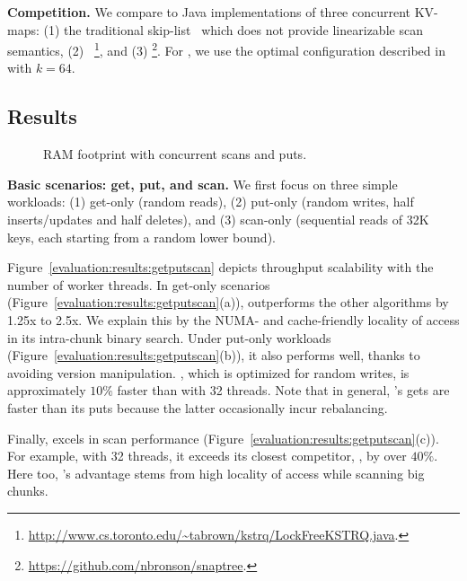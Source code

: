 \textbf{Competition.}
We compare {\kiwi} to Java implementations of three concurrent KV-maps: (1) the traditional 
skip-list~\cite{JavaConcurrentSkipList} which does not provide linearizable scan semantics, 
(2) {\kary}~\cite{BrownA12}\footnote{\small{\url{http://www.cs.toronto.edu/~tabrown/kstrq/LockFreeKSTRQ.java}}.}, 
and (3) {\snaptree}\cite{BronsonCCO2010}\footnote{\small{\url{https://github.com/nbronson/snaptree}}.}. 
For {\kary}, we use the optimal configuration described in~\cite{BrownA12} with $k=64$. 

\subsection{Results}


\begin{figure}
\begin{center}

\end{center}
\caption{RAM footprint with concurrent scans and puts. }
\label{evaluation:results:mem}
\end{figure}

\textbf{Basic scenarios: get, put, and scan.} 
We first focus on three simple workloads: 
(1) get-only (random reads), 
(2) put-only (random writes, half inserts/updates and half deletes), and 
(3) scan-only (sequential reads of 32K keys, each starting from a random lower bound).  

Figure~\ref{evaluation:results:getputscan} depicts throughput scalability with the number of worker threads. 
In get-only scenarios (Figure~\ref{evaluation:results:getputscan}(a)), {\kiwi} outperforms the other 
algorithms by 1.25x to 2.5x. We explain this by the NUMA- and cache-friendly locality of access in its intra-chunk binary search. 
Under put-only workloads (Figure~\ref{evaluation:results:getputscan}(b)), it also performs well, thanks to avoiding version
manipulation. {\snaptree}, which is optimized for random writes, is approximately $10\%$ faster than {\kiwi}
with 32 threads. Note that in general, {\kiwi}'s gets are faster than its puts because the latter occasionally incur rebalancing. 

Finally, {\kiwi} excels in scan performance (Figure~\ref{evaluation:results:getputscan}(c)). 
For example, with 32 threads, it exceeds its closest competitor, {\kary}, by over $40\%$. 
Here too, {\kiwi}'s advantage stems from high locality of access while scanning big chunks. 

